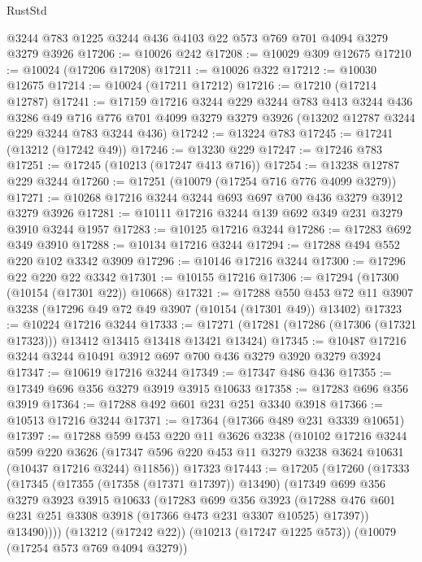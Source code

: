 \begin{lexlean}{RustStd}
\begin{coremodule}
    @3244
    @783
    @1225
    @3244
    @436
    @4103
    @22
    @573
    @769
    @701
    @4094
    @3279
    @3279
    @3926
@17206 := @10026 @242
@17208 := @10029 @309 @12675
@17210 := @10024 (@17206 @17208)
@17211 := @10026 @322
@17212 := @10030 @12675
@17214 := @10024 (@17211 @17212)
@17216 := @17210 (@17214 @12787)
@17241 := @17159
    @17216
    @3244
    @229
    @3244
    @783
    @413
    @3244
    @436
    @3286
    @49
    @716
    @776
    @701
    @4099
    @3279
    @3279
    @3926
    (@13202 @12787 @3244 @229 @3244 @783 @3244 @436)
@17242 := @13224 @783
@17245 := @17241 (@13212 (@17242 @49))
@17246 := @13230 @229
@17247 := @17246 @783
@17251 := @17245 (@10213 (@17247 @413 @716))
@17254 := @13238 @12787 @229 @3244
@17260 := @17251 (@10079 (@17254 @716 @776 @4099 @3279))
@17271 := @10268 @17216 @3244 @3244 @693 @697 @700 @436 @3279 @3912 @3279 @3926
@17281 := @10111 @17216 @3244 @139 @692 @349 @231 @3279 @3910 @3244 @1957
@17283 := @10125 @17216 @3244
@17286 := @17283 @692 @349 @3910
@17288 := @10134 @17216 @3244
@17294 := @17288 @494 @552 @220 @102 @3342 @3909
@17296 := @10146 @17216 @3244
@17300 := @17296 @22 @220 @22 @3342
@17301 := @10155 @17216
@17306 := @17294 (@17300 (@10154 (@17301 @22)) @10668)
@17321 := @17288
    @550
    @453
    @72
    @11
    @3907
    @3238
    (@17296 @49 @72 @49 @3907 (@10154 (@17301 @49)) @13402)
@17323 := @10224 @17216 @3244
@17333 := @17271 (@17281 (@17286 (@17306 (@17321 @17323))) @13412 @13415 @13418 @13421 @13424)
@17345 := @10487 @17216 @3244 @3244 @10491 @3912 @697 @700 @436 @3279 @3920 @3279 @3924
@17347 := @10619 @17216 @3244
@17349 := @17347 @486 @436
@17355 := @17349 @696 @356 @3279 @3919 @3915 @10633
@17358 := @17283 @696 @356 @3919
@17364 := @17288 @492 @601 @231 @251 @3340 @3918
@17366 := @10513 @17216 @3244
@17371 := @17364 (@17366 @489 @231 @3339 @10651)
@17397 := @17288
    @599
    @453
    @220
    @11
    @3626
    @3238
    (@10102
      @17216
      @3244
      @599
      @220
      @3626
      (@17347 @596 @220 @453 @11 @3279 @3238 @3624 @10631 (@10437 @17216 @3244) @11856))
    @17323
@17443 := @17205
    (@17260
      (@17333
        (@17345
          (@17355 (@17358 (@17371 @17397)) @13490)
          (@17349
            @699
            @356
            @3279
            @3923
            @3915
            @10633
            (@17283
              @699
              @356
              @3923
              (@17288 @476 @601 @231 @251 @3308 @3918 (@17366 @473 @231 @3307 @10525) @17397))
            @13490))))
    (@13212 (@17242 @22))
    (@10213 (@17247 @1225 @573))
    (@10079 (@17254 @573 @769 @4094 @3279))

\end{coremodule}
\end{lexlean}
